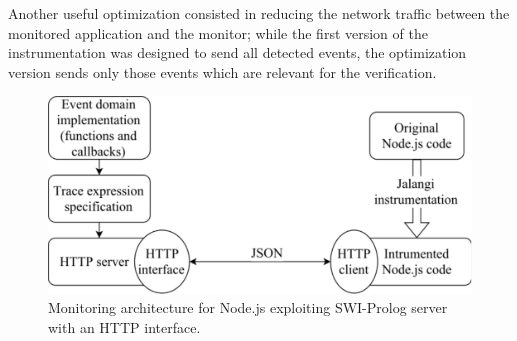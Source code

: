 Another useful optimization consisted in reducing the network traffic 
between the monitored application and the monitor; while
the first version of the instrumentation was designed to send
all detected events, the optimization version sends only those events 
which are relevant for the verification.


\begin{figure}
\centering\includegraphics[width=.7\textwidth]{fig/diagram}
\caption{Monitoring architecture for Node.js exploiting SWI-Prolog server with an HTTP interface.}
\label{fig:arch}
\end{figure}

